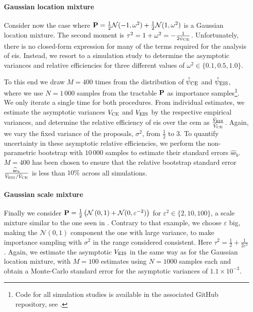 \begin{example}
    \paragraph{Gaussian location mixture}
    Consider now the case where $\P = \frac{1}{2} \mathcal N(-1, \omega^{2}) + \frac{1}{2}\mathcal N(1, \omega^{2})$ is a Gaussian location mixture. The second moment is $\tau^{2} = 1 + \omega^{2} = -\frac{1}{2\pce}$. Unfortunately, there is no closed-form expression for many of the terms required for the analysis of \gls{eis}. Instead, we resort to a simulation study to determine the asymptotic variances and relative efficiencies for three different values of $\omega^{2} \in \{0.1, 0.5, 1.0\}$. 
    
    To this end we draw $M = 400$ times from the distribution of $\hpce$ and $\hpeis$, where we use $N=1\,000$ samples from the tractable $\P$ as importance samples\footnote{Code for all simulation studies is available in the associated GitHub repository, see .}. We only iterate a single time for both procedures. From individual estimates, we estimate the asymptotic variances $V_{\ce}$ and $V_{\eis}$ by the respective empirical variances, and determine the relative efficiency of \gls{eis} over the \gls{cem} as $ \frac{\hat V_{\eis}}{\hat V_{\ce}}$. Again, we vary the fixed variance of the proposals, $\sigma^{2}$, from $\frac{1}{2}$ to $3$. 
    To quantify uncertainty in these asymptotic relative efficiencies, we perform the non-parametric bootstrap with $10\,000$ samples to estimate their standard errors $\widehat{\text{se}}_{b}$. $M=400$ has been chosen to ensure that the relative bootstrap standard error $ \frac{\widehat{\text{se}}_{b}}{\hat V_{\eis} / \hat V_{\ce}}$ is less than $10\%$ across all simulations. 
    
    \paragraph{Gaussian scale mixture}
    Finally we consider $\P = \frac{1}{2} \left(\mathcal N \left( 0, 1 \right) + \mathcal N (0, \varepsilon^{-2}) \right)$ for $\varepsilon^{2} \in \{2, 10, 100\}$, a scale mixture similar to the one seen in . Contrary to that example, we choose $\varepsilon$ big, making the $\mathcal N(0,1)$ component the one with large variance, to make importance sampling with $\sigma^{2}$ in the range considered consistent. 
    Here $\tau^{2} = \frac{1}{2} + \frac{1}{2\varepsilon^{2}}$. 
    Again, we estimate the asymptotic $V_{\eis}$ in the same way as for the Gaussian location mixture, with $M=100$ estimates using $N=1000$ samples each and obtain a Monte-Carlo standard error for the asymptotic variances of $1.1 \times 10^{-3}$.
\end{example}
